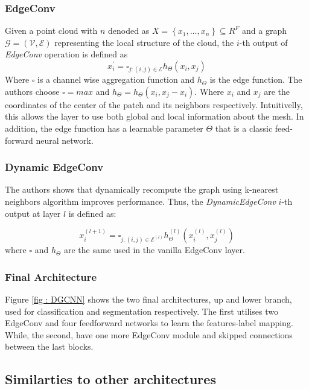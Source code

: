 \documentclass[twocolumn,showpacs,
  nofootinbib,aps,superscriptaddress,
  eqsecnum,prd,notitlepage,showkeys,10pt]{revtex4-1}
\begin{document}
\subsubsection{EdgeConv}
Given a point cloud with $n$ denoded as $X=\left\{x_{1}, \ldots, x_{n}\right\} \subseteq R^{F}$ and a graph $\mathcal{G}=(\mathcal{V}, \mathcal{E})$ representing the local structure of the cloud, the $i$-th output of \emph{EdgeConv} operation is defined as
\begin{equation}
  x_{i}^{\prime}=\square_{j :(i, j) \in \mathcal{E}} h_{\Theta}\left(x_{i}, x_{j}\right)
  \end{equation}
Where $\square$ is a channel wise aggregation function and $h_{\Theta}$ is the edge function. The authors choose $\square=max$ and $h_{\Theta} = h_{\Theta}(x_i, x_j - x_i)$. Where $x_i$ and $x_j$ are the coordinates of the center of the patch and its neighbors respectively. Intuitivelly, this allows the layer to use both global and local information about the mesh. In addition, the edge function has a learnable parameter $\Theta$ that is a classic feed-forward neural network. 
\subsubsection{Dynamic EdgeConv}
The authors shows that dynamically recompute the graph using k-nearest neighbors algorithm improves performance. Thus, the \emph{DynamicEdgeConv} $i$-th output at layer $l$ is defined as:

\begin{equation}
  x_{i}^{(l+1)}=\square_{j :(i, j) \in \mathcal{E}^{(l)}} h_{\Theta}^{(l)}\left(x_{i}^{(l)}, x_{j}^{(l)}\right)
\end{equation}
where $\square$ and $h_{\Theta}$ are the same used in the vanilla EdgeConv layer.

\subsubsection{Final Architecture}
Figure \ref{fig : DGCNN} shows the two final architectures, up and lower branch, used for classification and segmentation respectively. The first utilises two EdgeConv and four feedforward networks to learn the features-label mapping. While, the second, have one more EdgeConv module and skipped connections between the last blocks. 
\subsection{Similarties to other architectures}
\end{document}
